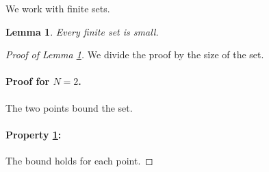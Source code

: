 \documentclass{article}
\newtheorem{lemma}{Lemma}
\begin{document}
We work with finite sets.
\begin{lemma}\label{small}
Every finite set is small.
\end{lemma}
\begin{proof}[Proof of Lemma \ref{small}]
We divide the proof by the size of the set.

\paragraph{Proof for $N=2$.} The two points bound the set.

\paragraph{Property \ref{small}:}
The bound holds for each point.
\end{proof}
\end{document}
